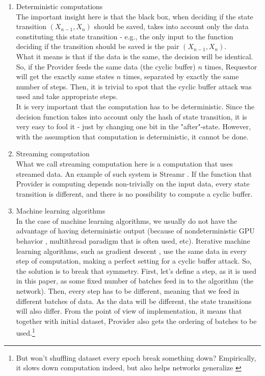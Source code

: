 \documentclass{winnower}
\begin{document}
\begin{enumerate}
\item Deterministic computations \\
The important insight here is that the black box, when deciding if the state transition $(X_{n-1}, X_{n})$ should be saved, takes into account only the data constituting this state transition - e.g., the only input to the function deciding if the transition should be saved is the pair $(X_{n-1}, X_{n})$.\\
What it means is that if the data is the same, the decision will be identical. So, if the Provider feeds the same data (the cyclic buffer) $n$ times, Requestor will get the exactly same states $n$ times, separated by exactly the same number of steps. Then, it is trivial to spot that the cyclic buffer attack was used and take appropriate steps. \\
It is very important that the computation has to be deterministic. Since the decision function takes into account only the hash of state transition, it is very easy to fool it - just by changing one bit in the "after"-state. However, with the assumption that computation is deterministic, it cannot be done.
\item Streaming computation\\
What we call streaming computation here is a computation that uses streamed data. An example of such system is Streamr \citep{streamr}. If the function that Provider is computing depends non-trivially on the input data, every state transition is different, and there is no possibility to compute a cyclic buffer.
\item Machine learning algorithms \\
In the case of machine learning algorithms, we usually do not have the advantage of having deterministic output (because of nondeterministic GPU behavior \citep{nondeterministicgpu}, multithread paradigm that is often used, etc). Iterative machine learning algorithms, such as gradient descent \citep{sgd}, use the same data in every step of computation, making a perfect setting for a cyclic buffer attack.
So, the solution is to break that symmetry. First, let's define a step, as it is used in this paper, as some fixed number of batches feed in to the algorithm (the network). Then, every step has to be different, meaning that we feed in different batches of data. As the data will be different, the state transitions will also differ. From the point of view of implementation, it means that together with initial dataset, Provider also gets the ordering of batches to be used.\footnote{But won't shuffling dataset every epoch break something down? Empirically, it slows down computation indeed, but also helps networks generalize \citep{shufflingbatches}}
\end{enumerate}
\end{document}
